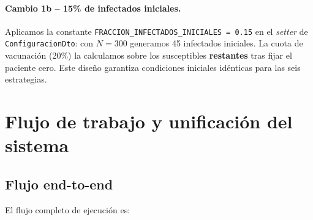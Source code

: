 \documentclass[spanish,notitlepage,letterpaper, 12pt]{article}
\begin{document}
\paragraph{Cambio 1b -- 15\% de infectados iniciales.} Aplicamos la constante \texttt{FRACCION\_INFECTADOS\_INICIALES = 0.15} en el \textit{setter} de \texttt{ConfiguracionDto}: con $N = 300$ generamos 45 infectados iniciales. La cuota de vacunaci\'on (20\%) la calculamos sobre los susceptibles \textbf{restantes} tras fijar el paciente cero. Este dise\~no garantiza condiciones iniciales id\'enticas para las seis estrategias.

\newpage
\section{Flujo de trabajo y unificaci\'on del sistema}
\label{sec:flujo}

\subsection{Flujo end-to-end}


El flujo completo de ejecuci\'on es:
\end{document}
